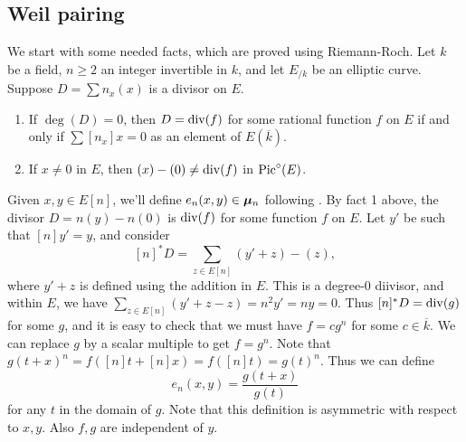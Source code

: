 \subsection{Weil pairing}

We start with some needed facts, which are proved using Riemann-Roch. Let 
$k$ be a field, $n\geqslant 2$ an integer invertible in $k$, and let 
$E_{/k}$ be an elliptic curve. Suppose $D=\sum n_x(x)$ is a divisor on $E$. 
\begin{enumerate}
\item
If $\deg(D)=0$, then $D=\operatorname{div}(f)$ for some rational function $f$ on $E$ if 
and only if $\sum [n_x] x=0$ as an element of $E(\overline k)$. 

\item
If $x\ne 0$ in $E$, then $(x)-(0)\ne \operatorname{div}(f)$ in $\operatorname{Pic}^\circ(E)$. 
\end{enumerate}

Given $x,y\in E[n]$, we'll define $e_n(x,y)\in {\bm\mu}_n$ following 
\cite[III \S 8]{silverman-2009}. By fact 1 above, the divisor 
$D=n(y)-n(0)$ is $\operatorname{div}(f)$ for some function $f$ on $E$. Let $y'$ be such 
that $[n]y'=y$, and consider 
\[
  [n]^\ast D = \sum_{z\in E[n]} (y'+z)-(z) ,
\]
where $y'+z$ is defined using the addition in $E$. This is a degree-$0$ 
diivisor, and within $E$, we have $\sum_{z\in E[n]}(y'+z-z)=n^2 y' = n y = 0$. 
Thus $[n]^\ast D=\operatorname{div}(g)$ for some $g$, and it is easy to check that we 
must have $f = c g^n$ for some $c\in \overline k$. We can replace $g$ by a 
scalar multiple to get $f=g^n$. Note that 
$g(t+x)^n = f([n] t+[n] x) = f([n] t) = g(t)^n$. Thus we can define 
\[
  e_n(x,y) = \frac{g(t+x)}{g(t)}
\]
for any $t$ in the domain of $g$. Note that this definition is 
asymmetric with respect to $x,y$. Also $f,g$ are independent of $y$. 

